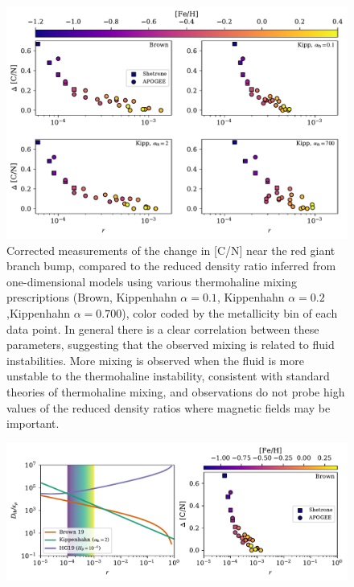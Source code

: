 \begin{figure}[!tb]
\begin{center}
\includegraphics[width=\textwidth]{./figures/mixing_vs_r/mixing_vs_r.pdf}%
\caption{Corrected measurements of the change in [C/N] near the red giant branch bump, compared to the reduced density ratio inferred from one-dimensional models using various thermohaline mixing prescriptions (Brown, Kippenhahn $\alpha=0.1$, Kippenhahn $\alpha=0.2$,Kippenhahn $\alpha=0.700$), color coded by the metallicity bin of each data point. In general there is a clear correlation between these parameters, suggesting that the observed mixing is related to fluid instabilities. More mixing is observed when the fluid is more unstable to the thermohaline instability, consistent with standard theories of thermohaline mixing, and observations do not probe high values of the reduced density ratios where magnetic fields may be important.
\label{Fig:punchline}
}
\end{center}
\end{figure}

\begin{figure}[!tb]
\begin{center}
\includegraphics[width=\textwidth]{./figures/punchline/punchline.pdf}
\caption{
\label{Fig:compare}
}
\end{center}
\end{figure}



